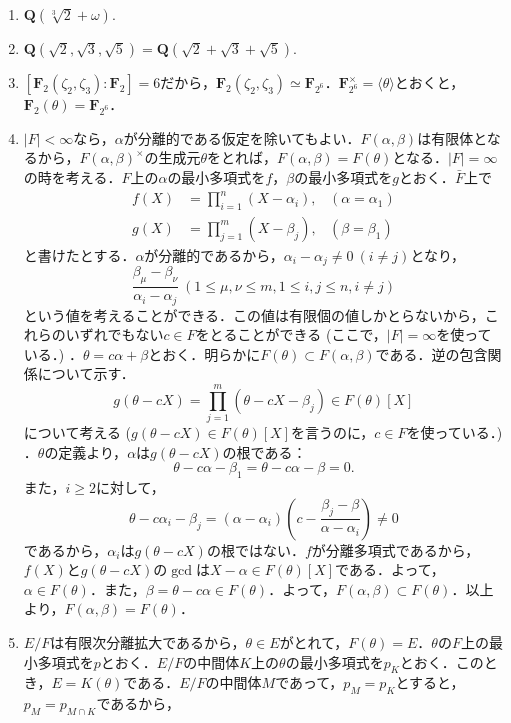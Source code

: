 \documentclass[a4paper,10pt]{ltjsarticle}
\begin{document}
\begin{enumerate}[]
  \[ [E : F] = [E : F(\alpha)][F(\alpha) : F] \le (n - 1)! \cdot n = n! \]
  \item \label{enshu:1.28} $\mathbf{Q}(\sqrt[3]{2} + \omega).$
  \item \label{enshu:1.29} $\mathbf{Q}(\sqrt{2}, \sqrt{3}, \sqrt{5}) = \mathbf{Q}(\sqrt{2} + \sqrt{3} + \sqrt{5}).$
  \item \label{enshu:1.30} $[\mathbf{F}_2(\zeta_2, \zeta_3) : \mathbf{F}_2] = 6$だから，$\mathbf{F}_2(\zeta_2, \zeta_3) \simeq \mathbf{F}_{2^6}$．$\mathbf{F}_{2^6}^{\times} = \langle\theta\rangle$とおくと，$\mathbf{F}_{2}(\theta) = \mathbf{F}_{2^6}$．
  \item \label{enshu:1.31} $|F| < \infty$なら，$\alpha$が分離的である仮定を除いてもよい．$F(\alpha, \beta)$は有限体となるから，$F(\alpha, \beta)^{\times}$の生成元$\theta$をとれば，$F(\alpha, \beta) = F(\theta)$となる．$|F| = \infty$の時を考える．$F$上の$\alpha$の最小多項式を$f$，$\beta$の最小多項式を$g$とおく．$\bar{F}$上で
  \begin{align*}
    f(X) &= \prod_{i = 1}^n (X - \alpha_i), &(\alpha = \alpha_1) \\
    g(X) &= \prod_{j = 1}^m (X - \beta_j), &(\beta = \beta_1)
  \end{align*}
  と書けたとする．$\alpha$が分離的であるから，$\alpha_i - \alpha_j \ne 0 \ (i \ne j)$となり，
  \[ \frac{\beta_\mu - \beta_\nu}{\alpha_i - \alpha_j} \ (1 \le \mu, \nu \le m, 1 \le i, j \le n, i \ne j) \]
  という値を考えることができる．この値は有限個の値しかとらないから，これらのいずれでもない$c \in F$をとることができる (ここで，$|F| = \infty$を使っている．) ．$\theta = c\alpha + \beta$とおく．明らかに$F(\theta) \subset F(\alpha, \beta)$である．逆の包含関係について示す．
  \[ g(\theta - cX) = \prod_{j = 1}^{m}(\theta - cX - \beta_j)  \in F(\theta)[X] \]
  について考える ($g(\theta - cX) \in F(\theta)[X]$を言うのに，$c \in F$を使っている．) ．$\theta$の定義より，$\alpha$は$g(\theta - cX)$の根である：
  \[ \theta - c\alpha - \beta_1 = \theta - c\alpha - \beta = 0. \]
  また，$i \ge 2$に対して，
  \[ \theta - c\alpha_i - \beta_j = (\alpha - \alpha_i) \left(c - \frac{\beta_j - \beta}{\alpha - \alpha_i}\right) \ne 0 \]
  であるから，$\alpha_i$は$g(\theta - cX)$の根ではない．$f$が分離多項式であるから，$f(X)$と$g(\theta - cX)$の$\gcd$は$X - \alpha \in F(\theta)[X]$である．よって，$\alpha \in F(\theta)$．また，$\beta = \theta - c\alpha \in F(\theta)$．よって，$F(\alpha, \beta) \subset F(\theta)$．以上より，$F(\alpha, \beta) = F(\theta)$．
  \item \label{enshu:1.32} $E / F$は有限次分離拡大であるから，$\theta \in E$がとれて，$F(\theta) = E$．$\theta$の$F$上の最小多項式を$p$とおく．$E / F$の中間体$K$上の$\theta$の最小多項式を$p_K$とおく．このとき，$E = K(\theta)$である．$E / F$の中間体$M$であって，$p_M = p_K$とすると，$p_M = p_{M \cap K}$であるから，

\end{enumerate}
\end{document}
